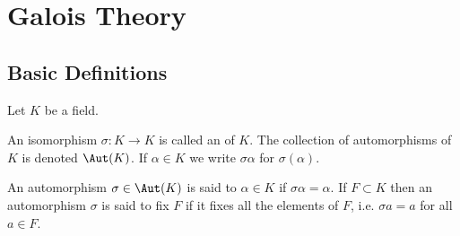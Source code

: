 \chapter{Galois Theory}
\section{Basic Definitions}
Let $K$ be a field.
\begin{definition}
An isomorphism $\sigma:K\to K$ is called an  of $K$. The collection of automorphisms of $K$ is denoted $\Aut(K)$. If $\alpha\in K$ we write $\sigma\alpha$ for $\sigma(\alpha)$.

An automorphism $\sigma\in\Aut(K)$ is said to  $\alpha\in K$ if $\sigma\alpha=\alpha$. If $F\subset K$ then an automorphism $\sigma$ is said to fix $F$ if it fixes all the elements of $F$, i.e. $\sigma a=a$ for all $a\in F$.
\end{definition}